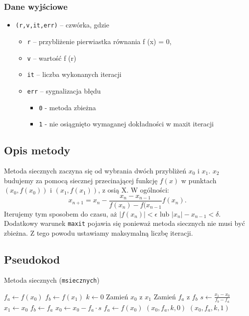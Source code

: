 \documentclass{article}
\begin{document}
\subsubsection*{Dane wyjściowe}
\begin{itemize}
    \item \texttt{(r,v,it,err)} – czwórka, gdzie
    \begin{itemize}
        \item \texttt{r} – przybliżenie pierwiastka równania f (x) = 0,
        \item \texttt{v} – wartość f (r)
        \item \texttt{it} – liczba wykonanych iteracji
        \item \texttt{err} – sygnalizacja błędu
        \begin{itemize}
            \item \texttt{0} - metoda zbieżna
            \item \texttt{1} - nie osiągnięto wymaganej dokładności w maxit iteracji
        \end{itemize}
    \end{itemize}
\end{itemize}
\subsection*{Opis metody}
Metoda siecznych zaczyna się od wybrania dwóch przybliżeń $x_0$ i $x_1$. $x_2$ budujemy za pomocą siecznej przecinającej funkcję $f(x)$ w punktach $(x_0 , f (x_0 ))$ i $(x_1 , f (x_1 ))$, z osią X. W ogólności:
\[
x_{n+1}=x_n-\frac{x_n-x_{n-1}}{f(x_n)-f(x_{n-1}}f(x_n).
\]
Iterujemy tym sposobem do czasu, aż $|f(x_n)|<\epsilon$ lub $|x_n|-x_{n-1}<\delta$. Dodatkowy warunek \texttt{maxit} pojawia się ponieważ metoda siecznych nie musi być zbieżna. Z tego powodu ustawiamy maksymalną liczbę iteracji. 
\subsection*{Pseudokod}
\begin{algorithm}
\caption{Metoda siecznych (\texttt{msiecznych})}
\begin{algorithmic}[1]
    \State $f_a \gets f(x_0)$
    \State $f_b \gets f(x_1)$
    \State $k \gets 0$
            \State Zamień $x_0$ z $x_1$
            \State Zamień $f_a$ z $f_b$
        \EndIf
        \State $s \gets \frac{x_1 - x_0}{f_b - f_a}$ 
        \State $x_1 \gets x_0$
        \State $f_b \gets f_a$
        \State $x_0 \gets x_0 - f_a \cdot s$
        \State $f_a \gets f(x_0)$
            \State \Return $(x_0, f_a, k, 0)$ 
        \EndIf
    \EndFor
    \State \Return $(x_0, f_a, k, 1)$ 
\EndFunction
\end{algorithmic}
\end{algorithm}
\end{document}
